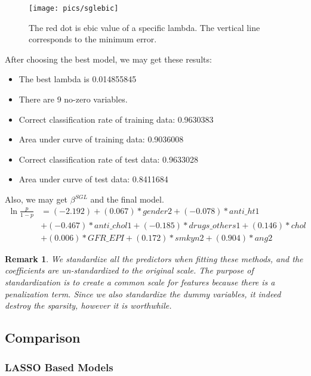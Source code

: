 \documentclass[]{article}
\newtheorem{remark}{Remark}
\begin{document}
\begin{figure}[H]
	\centering
	\texttt{[image: pics/sglebic]}
	\caption{The red dot is ebic value of a specific lambda. The vertical line corresponds to the minimum error.\label{fig=sglebic}}
\end{figure}

After choosing the best model, we may get these results:
\begin{itemize}
	\item The best lambda is 0.014855845
	\item There are 9 no-zero variables.
	\item Correct classification rate of training data: 0.9630383
	\item Area under curve of training data: 0.9036008
	\item Correct classification rate of test data: 0.9633028
	\item Area under curve of test data: 0.8411684
\end{itemize}

Also, we may get $ \beta^{SGL} $ and the final model.
\begin{align*}
\ln\frac{p}{1-p}&=(-2.192) + (0.067)*gender2 + ( -0.078)*anti\_ht1\\ &+
( -0.467)*anti\_chol1 + ( -0.185)*drugs\_others1 + (0.146)*chol \\ &+
(0.006)*GFR\_EPI + (0.172)*smkyn2 + (0.904)*ang2
\end{align*}

\begin{remark}
	We standardize all the predictors when fitting these methods, and the coefficients are un-standardized to the original scale. The purpose of standardization is to create a common scale for features because there is a penalization term. Since we also standardize the dummy variables, it indeed destroy the sparsity, however it is worthwhile.
\end{remark}

\subsection{Comparison}
\subsubsection{LASSO Based Models}
\end{document}
